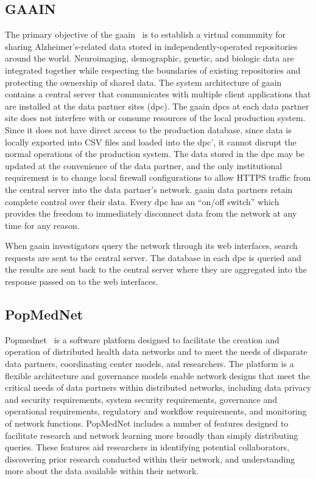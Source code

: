 \subsection*{GAAIN}
The primary objective of the \gls{gaain}~\cite{gaain} is to establish a virtual community for sharing Alzheimer's-related data stored in independently-operated repositories around the world.
Neuroimaging, demographic, genetic, and biologic data are integrated together while respecting the boundaries of existing repositories and protecting the ownership of shared data.
The system architecture of \gls{gaain} contains a central server that communicates with multiple client applications that are installed at the data partner sites (\gls{dpc}).
The \gls{gaain} \gls{dpc}s at each data partner site does not interfere with or consume resources of the local production system.
Since it does not have direct access to the production database, since data is locally exported into CSV files and loaded into the \gls{dpc}', it cannot disrupt the normal operations of the production system.
The data stored in the \gls{dpc} may be updated at the convenience of the data partner, and the only institutional requirement is to change local firewall configurations to allow HTTPS traffic from the central server into the data partner's network.
\gls{gaain} data partners retain complete control over their data.
Every \gls{dpc} has an “on/off switch” which provides the freedom to immediately disconnect data from the network at any time for any reason.

When \gls{gaain} investigators query the network through its web interfaces, search requests are sent to the central server.
The database in each \gls{dpc} is queried and the results are sent back to the central server where they are aggregated into the response passed on to the web interfaces.

\subsection*{PopMedNet}
Popmednet~\cite{popmednet} is a software platform designed to facilitate the creation and operation of distributed health data networks and to meet the needs of disparate data partners, coordinating center models, and researchers.
The platform is a flexible architecture and governance models enable network designs that meet the critical needs of data partners within distributed networks, including data privacy and security requirements, system security requirements, governance and operational requirements, regulatory and workflow requirements, and monitoring of network functions.
PopMedNet includes a number of features designed to facilitate research and network learning more broadly than simply distributing queries.
These features aid researchers in identifying potential collaborators, discovering prior research conducted within their network, and understanding more about the data available within their network.

